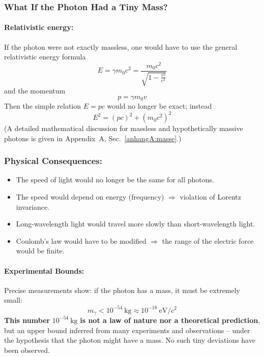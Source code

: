 \subsubsection{What If the Photon Had a Tiny Mass?}

\paragraph*{Relativistic energy:} If the photon were not exactly massless, one would have to use the general relativistic energy formula
$$
E = \gamma m_0 c^2 = \frac{m_0 c^2}{\sqrt{1 - \frac{v^2}{c^2}}}
$$
and the momentum
$$
p = \gamma m_0 v
$$
Then the simple relation $E = pc$ would no longer be exact; instead
$$
E^2 = (pc)^2 + (m_0 c^2)^2
$$
(A detailed mathematical discussion for massless and hypothetically massive photons is given in Appendix~A, Sec.~\ref{anhangA:masse}.)
\newpage
\noindent
\subsubsection*{Physical Consequences:}
\begin{itemize}
	\item The speed of light would no longer be the same for all photons.
	\item The speed would depend on energy (frequency) $\Rightarrow$ violation of Lorentz invariance.
	\item Long-wavelength light would travel more slowly than short-wavelength light.
	\item Coulomb's law would have to be modified $\Rightarrow$ the range of the electric force would be finite.
\end{itemize}

\paragraph*{Experimental Bounds:}
Precise measurements show: if the photon has a mass, it must be extremely small:
$$
m_\gamma < 10^{-54}~\text{kg} \approx 10^{-18}~\text{eV}/c^2
$$
\textbf{This number} $10^{-54}~\text{kg}$ \textbf{is not a law of nature nor a theoretical prediction}, but an upper bound inferred from many experiments and observations – under the hypothesis that the photon might have a mass. No such tiny deviations have been observed.

